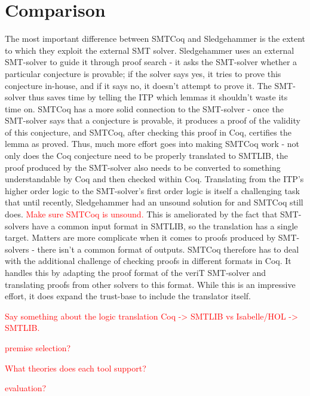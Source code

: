 \documentclass{article}
\begin{document}
\section{Comparison}
\label{sec:comp}
	The most important difference between SMTCoq and Sledgehammer
	is the extent to which they exploit the external SMT solver. 
	Sledgehammer uses an external SMT-solver to guide it through 
	proof search - it asks the SMT-solver whether a particular 
	conjecture is provable; if the solver says yes, 
	it tries to prove this conjecture in-house, and if it says 
	no, it doesn't attempt to prove it. The SMT-solver thus 
	saves time by telling the ITP which lemmas it shouldn't
	waste its time on. SMTCoq has a more solid connection to 
	the SMT-solver - once the SMT-solver says that a conjecture is 
	provable, it produces a proof of the validity of this 
	conjecture, and SMTCoq, after checking this proof in 
	Coq, certifies the lemma as proved. Thus,
	much more effort goes into making SMTCoq work - not only 
	does the Coq conjecture need to be properly translated to 
	SMTLIB, the proof produced by the SMT-solver also 
	needs to be converted to something understandable 
	by Coq and then checked within Coq. Translating from the ITP's 
	higher order logic to the SMT-solver's first order logic 
	is itself a challenging task that until recently, Sledgehammer 
	had an unsound solution for and SMTCoq still does. 
	\textcolor{red}{Make sure SMTCoq is unsound.} 
	This is ameliorated by the fact that
	SMT-solvers have a common input format in SMTLIB, so the 
	translation has a single target. Matters are more complicate 
	when it comes to proofs produced by SMT-solvers - there isn't 
	a common format of outputs. SMTCoq therefore has to deal with 
	the additional challenge of checking proofs in different 
	formats in Coq. It handles this by adapting the proof 
	format of the veriT SMT-solver and translating proofs 
	from other solvers to this format. While this is an impressive
	effort, it does expand the trust-base to include the 
	translator itself.
	
	\textcolor{red}{Say something about the logic translation 
		Coq -> SMTLIB vs 
		Isabelle/HOL -> SMTLIB.}
	
	\textcolor{red}{premise selection?}
	
	\textcolor{red}{What theories does each tool support?}
	
	\textcolor{red}{evaluation?}
	
	
\end{document}
